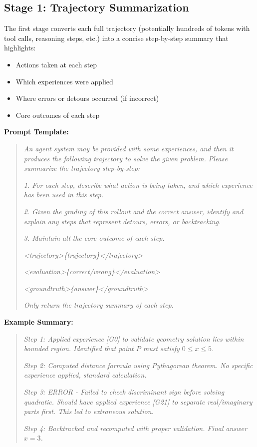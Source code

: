 \subsection{Stage 1: Trajectory Summarization}

The first stage converts each full trajectory (potentially hundreds of tokens with tool calls, reasoning steps, etc.) into a concise step-by-step summary that highlights:
\begin{itemize}
    \item Actions taken at each step
    \item Which experiences were applied
    \item Where errors or detours occurred (if incorrect)
    \item Core outcomes of each step
\end{itemize}

\textbf{Prompt Template:}
\begin{quote}
\small
\textit{An agent system may be provided with some experiences, and then it produces the following trajectory to solve the given problem. Please summarize the trajectory step-by-step:}

\textit{1. For each step, describe what action is being taken, and which experience has been used in this step.}

\textit{2. Given the grading of this rollout and the correct answer, identify and explain any steps that represent detours, errors, or backtracking.}

\textit{3. Maintain all the core outcome of each step.}

\textit{<trajectory>\{trajectory\}</trajectory>}

\textit{<evaluation>\{correct/wrong\}</evaluation>}

\textit{<groundtruth>\{answer\}</groundtruth>}

\textit{Only return the trajectory summary of each step.}
\end{quote}

\textbf{Example Summary:}
\begin{quote}
\small
\textit{Step 1: Applied experience [G0] to validate geometry solution lies within bounded region. Identified that point $P$ must satisfy $0 \leq x \leq 5$.}

\textit{Step 2: Computed distance formula using Pythagorean theorem. No specific experience applied, standard calculation.}

\textit{Step 3: ERROR - Failed to check discriminant sign before solving quadratic. Should have applied experience [G21] to separate real/imaginary parts first. This led to extraneous solution.}

\textit{Step 4: Backtracked and recomputed with proper validation. Final answer $x = 3$.}
\end{quote}

